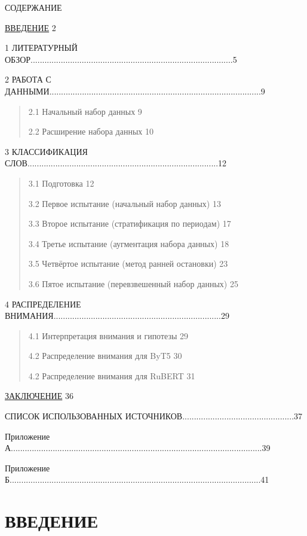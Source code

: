 СОДЕРЖАНИЕ

\hyperref[ux432ux432ux435ux434ux435ux43dux438ux435]{ВВЕДЕНИЕ} 2

1 ЛИТЕРАТУРНЫЙ ОБЗОР.......................................................................................5

2 РАБОТА С ДАННЫМИ...........................................................................................9

\begin{quote}
2.1 Начальный набор данных 9

2.2 Расширение набора данных 10
\end{quote}

3 КЛАССИФИКАЦИЯ СЛОВ..................................................................................12

\begin{quote}
3.1 Подготовка 12

3.2 Первое испытание (начальный набор данных) 13

3.3 Второе испытание (стратификация по периодам) 17

3.4 Третье испытание (аугментация набора данных) 18

3.5 Четвёртое испытание (метод ранней остановки) 23

3.6 Пятое испытание (перевзвешенный набор данных) 25
\end{quote}

4 РАСПРЕДЕЛЕНИЕ ВНИМАНИЯ........................................................................29

\begin{quote}
4.1 Интерпретация внимания и гипотезы 29

4.2 Распределение внимания для ByT5 30

4.2 Распределение внимания для RuBERT 31
\end{quote}

\hyperref[ux437ux430ux43aux43bux44eux447ux435ux43dux438ux435]{ЗАКЛЮЧЕНИЕ} 36

СПИСОК ИСПОЛЬЗОВАННЫХ ИСТОЧНИКОВ................................................37

Приложение А............................................................................................................39

Приложение Б............................................................................................................41

\section{ВВЕДЕНИЕ}\label{ux432ux432ux435ux434ux435ux43dux438ux435}

